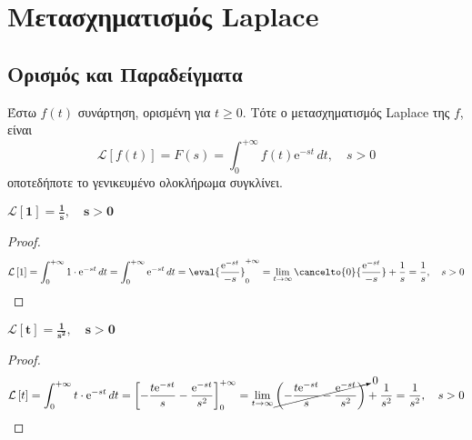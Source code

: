 


\geometry{left=15.63mm,right=15.63mm,top=30.25mm,bottom=36.25mm,
footskip=24.16mm,headsep=24.16mm}

\pagestyle{vangelis}
\everymath{\displaystyle}

\renewcommand{\qedsymbol}{}

{\topsep}{\topsep}%
{}{}%
{\color{Col1}\bfseries}{}%
{\baselineskip}{}%





\chapter*{Μετασχηματισμός Laplace}

\vspace{\baselineskip}


\section*{Ορισμός και Παραδείγματα}

\begin{dfn}
  Έστω $ f(t) $ συνάρτηση, ορισμένη για $ t \geq 0 $. Τότε ο μετασχηματισμός Laplace 
  της $f$, είναι
  \begin{equation}\label{eq:laplace}
    \mathcal{L} \left[f(t)\right] = F(s) = \int _{0}^{+\infty} f(t) 
    \mathrm{e}^{-st} \,{dt}, \quad s>0
  \end{equation} 
  οποτεδήποτε το γενικευμένο ολοκλήρωμα συγκλίνει.
\end{dfn}

\begin{example}
  $ \boldsymbol{\mathcal{L}\left[1\right] = \frac{1}{s}, \quad s > 0} $
\end{example}
\begin{proof}
  \[
    \mathcal{L}\left[1\right] = \int_{0}^{+\infty} 1\cdot \mathrm{e}^{-st} \,{dt} =  
    \int_{0}^{+\infty} \mathrm{e}^{-st} \,{dt} = \eval{\frac{\mathrm{e}^{-st}}{-s}}
    _{0}^{+\infty} = \lim_{t \to \infty} \cancelto{0}{\frac{\mathrm{e}^{-st}}{-s}} 
    + \frac{1}{s} = \frac{1}{s} , \quad s>0 
  \] 
\end{proof}

\begin{example}
  $ \boldsymbol{\mathcal{L}\left[t\right] = \frac{1}{s^{2}}, \quad s>0} $
\end{example}
\begin{proof}
  \[
    \mathcal{L}\left[t\right] = \int_{0}^{+\infty} t \cdot \mathrm{e}^{-st} \,{dt} = 
    \left[-\frac{t \mathrm{e}^{-st}}{s} - \frac{\mathrm{e}^{-st}}{s^{2}}\right]
    _{0}^{+\infty} = \lim_{t \to \infty} 
    \cancelto{0}{\left(- \frac{t\mathrm{e}^{-st}}{s} -
    \frac{\mathrm{e}^{-st}}{s^{2}}\right)} + \frac{1}{s^{2}} = \frac{1}{s^{2}} , 
    \quad s>0
  \] 
\end{proof}

